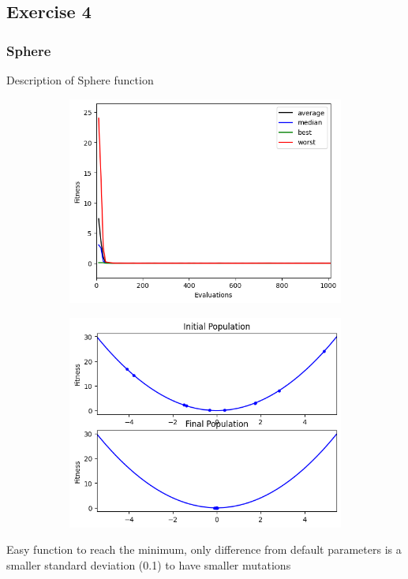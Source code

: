 \subsection{Exercise 4}
\subsubsection{Sphere}
Description of Sphere function
\begin{figure}[H]
    \centering
    \begin{subfigure}[t]{0.5\textwidth}
        \centering
        \includegraphics[width=\linewidth]{images/lab2/sphere_eval.png}
    \end{subfigure}%
    \begin{subfigure}[t]{0.5\textwidth}
        \centering
        \includegraphics[width=\linewidth]{images/lab2/sphere_pop.png}
    \end{subfigure}
\end{figure}
Easy function to reach the minimum, only difference from default parameters is a smaller standard deviation (0.1) to have smaller mutations

